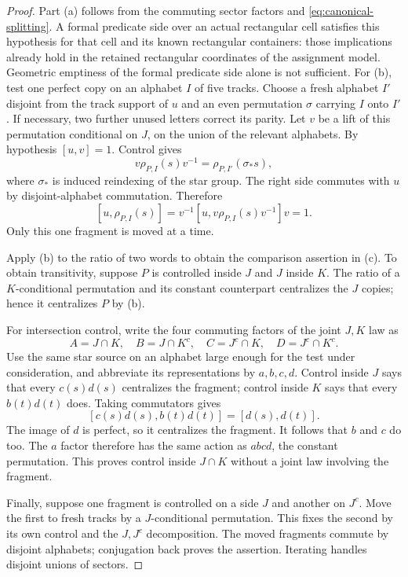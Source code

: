\begin{proof}
Part (a) follows from the commuting sector factors and
\eqref{eq:canonical-splitting}.  A formal predicate side over
an actual rectangular cell satisfies this hypothesis for that
cell and its known rectangular containers: those implications
already hold in the retained rectangular coordinates of the
assignment model.  Geometric emptiness of the formal predicate
side alone is not sufficient.  For (b), test one perfect
copy on an alphabet $I$ of five tracks.  Choose a fresh alphabet
$I'$ disjoint from the track support of $u$ and an even
permutation $\sigma$ carrying $I$ onto $I'$.  If necessary,
two further unused letters correct its parity.  Let $v$ be a
lift of this permutation conditional on $J$, on the union
of the relevant alphabets.  By hypothesis $[u,v]=1$.
Control gives
\[
 v\rho_{P,I}(s)v^{-1}
   =\rho_{P,I'}(\sigma_*s),
\]
where $\sigma_*$ is induced reindexing of the star group.
The right side commutes with $u$ by disjoint-alphabet
commutation.  Therefore
\begin{equation}\label{eq:conditional-move}
 [u,\rho_{P,I}(s)]
 =v^{-1}[u,v\rho_{P,I}(s)v^{-1}]v=1.
\end{equation}
Only this one fragment is moved at a time.

Apply (b) to the ratio of two words to obtain the comparison
assertion in (c).  To obtain transitivity, suppose $P$ is
controlled inside $J$ and $J$ inside $K$.  The ratio of a
$K$-conditional permutation and its constant counterpart
centralizes the $J$ copies; hence it centralizes $P$ by (b).

For intersection control, write the four commuting factors
of the joint $J,K$ law as
\[
 A=J\cap K,\quad B=J\cap K^c,\quad
 C=J^c\cap K,\quad D=J^c\cap K^c.
\]
Use the same star source on an alphabet large enough for the
test under consideration, and abbreviate its representations
by $a,b,c,d$.  Control inside $J$ says that every
$c(s)d(s)$ centralizes the fragment; control inside $K$ says
that every $b(t)d(t)$ does.  Taking commutators gives
\[
 [c(s)d(s),b(t)d(t)]=[d(s),d(t)].
\]
The image of $d$ is perfect, so it centralizes the fragment.
It follows that $b$ and $c$ do too.  The $a$ factor therefore
has the same action as $abcd$, the constant permutation.
This proves control inside $J\cap K$ without a joint law
involving the fragment.

Finally, suppose one fragment is controlled on a side $J$
and another on $J^c$.  Move the first to fresh tracks by a
$J$-conditional permutation.  This fixes the second by its
own control and the $J,J^c$ decomposition.  The moved
fragments commute by disjoint alphabets; conjugation back
proves the assertion.  Iterating handles disjoint unions
of sectors.
\end{proof}

